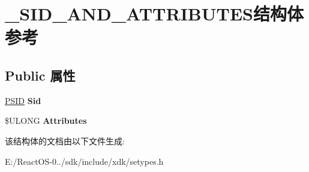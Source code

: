 \hypertarget{struct___s_i_d___a_n_d___a_t_t_r_i_b_u_t_e_s}{}\section{\+\_\+\+S\+I\+D\+\_\+\+A\+N\+D\+\_\+\+A\+T\+T\+R\+I\+B\+U\+T\+E\+S结构体 参考}
\label{struct___s_i_d___a_n_d___a_t_t_r_i_b_u_t_e_s}
\subsection*{Public 属性}
\begin{DoxyCompactItemize}
\item 
\mbox{\label{struct___s_i_d___a_n_d___a_t_t_r_i_b_u_t_e_s_a65626cb95688165a5d004e32a6e48d48}} 
\hyperlink{struct___s_i_d}{P\+S\+ID} {\bfseries Sid}
\item 
\mbox{\label{struct___s_i_d___a_n_d___a_t_t_r_i_b_u_t_e_s_ae725e140cb39b212ac59a5866ff719ee}} 
\$U\+L\+O\+NG {\bfseries Attributes}
\end{DoxyCompactItemize}


该结构体的文档由以下文件生成\+:\begin{DoxyCompactItemize}
\item 
E\+:/\+React\+O\+S-\/0../sdk/include/xdk/setypes.\+h\end{DoxyCompactItemize}
